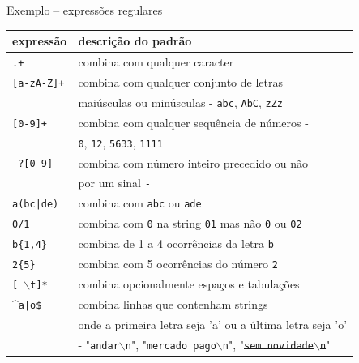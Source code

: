 \begin{frame}{Exemplo -- expressões regulares}

 \footnotesize
 \center
 \begin{tabular}{ll}
   \toprule
   \bf expressão & \bf          descrição do padrão\\
   \midrule
   {\tt .+}      &           combina com qualquer caracter\\
   {\tt [a-zA-Z]+} &         combina com qualquer conjunto de letras\\
                 &    maiúsculas ou minúsculas - {\tt abc}, {\tt AbC}, {\tt zZz}\\
   {\tt [0-9]+}      &       combina com qualquer sequência de números -\\
                 &  {\tt 0}, {\tt 12}, {\tt 5633}, {\tt 1111}\\
   {\tt -?[0-9]}        &     combina com número inteiro precedido ou não\\
                 & por um sinal {\tt -}\\
   {\tt a(bc|de)}      &     combina com {\tt abc} ou {\tt ade}\\
   {\tt 0/1}            &    combina com {\tt 0} na string {\tt 01} mas não {\tt 0} ou {\tt 02}\\
   {\tt b\{1,4\}}          &   combina de 1 a 4 ocorrências da letra {\tt b}\\
   {\tt 2\{5\}}            &   combina com 5 ocorrências do número {\tt 2}\\
   {\tt [ $\backslash$t]*} &   combina opcionalmente espaços e tabulações\\
   \^{}{\tt a|o\$}          &    combina linhas que contenham strings\\
                 & onde a primeira letra seja 'a' ou a última letra seja 'o'\\
                 & - "{\tt andar$\backslash$n}", "{\tt mercado pago$\backslash$n}", "\sout{{\tt sem novidade$\backslash$n}}"\\
   \bottomrule
 \end{tabular}
\end{frame}

